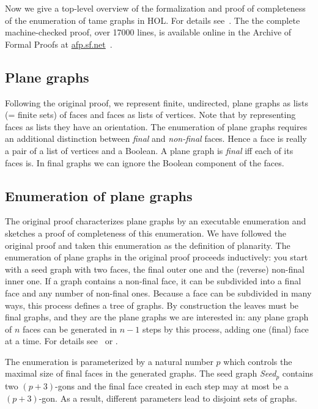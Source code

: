 \documentclass[11pt]{amsart}
\begin{document}
Now we give a top-level overview of the formalization and proof of
completeness of the enumeration of tame graphs in HOL. For details
see~\cite{NipkowBS-IJCAR06}. The the complete machine-checked proof, over
17000 lines, is available online in the Archive of Formal Proofs at
\url{afp.sf.net}~\cite{BauerN-AFP06}.

\subsection{Plane graphs}

Following the original proof, we represent finite, undirected, plane graphs as lists
(= finite sets) of faces and faces as lists of vertices. Note that by
representing faces as lists they have an orientation. The enumeration of
plane graphs requires an additional distinction between \emph{final}
and \emph{non-final} faces. Hence a face is really a pair of a list
of vertices and a Boolean.
A plane graph is \emph{final} iff each of its faces is.
In final graphs we can ignore the Boolean component of the faces.

\subsection{Enumeration of plane graphs}

The original proof characterizes plane graphs by an executable enumeration and sketches a
proof of completeness of this enumeration. We have followed the original proof and taken
this enumeration as the definition of planarity.  The enumeration of plane
graphs in the original proof proceeds inductively: you start with a seed graph with two faces, the
final outer one and the (reverse) non-final inner one. If a graph contains a
non-final face, it can be subdivided into a final face and any number of
non-final ones.  Because a face can be subdivided in many ways, this process
defines a tree of graphs. By construction the leaves must be final graphs,
and they are the plane graphs we are interested in: any plane graph of $n$
faces can be generated in $n-1$ steps by this process, adding one (final)
face at a time. For details see~\cite{Hales:2006:DCG} or
\cite{NipkowBS-IJCAR06}.

The enumeration is parameterized by a natural number $p$ which controls the
maximal size of final faces in the generated graphs. The seed graph
\textit{Seed$_p$} contains two $(p+3)$-gons and the final
face created in each step may at most be a $(p+3)$-gon. As a result,
different parameters lead to disjoint sets of graphs.
\end{document}
